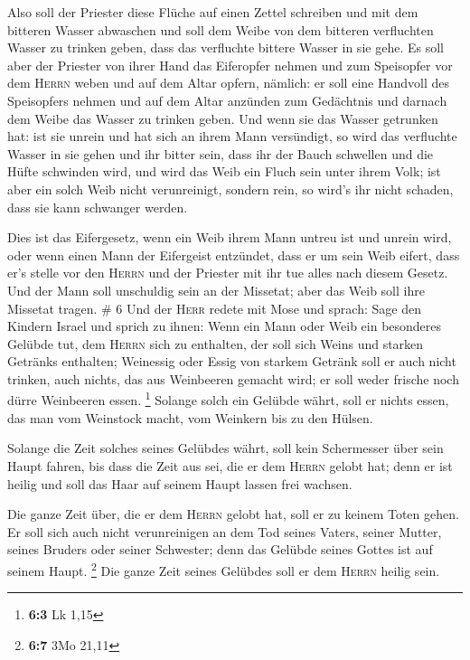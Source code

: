  Also soll der Priester diese Flüche auf einen Zettel
schreiben und mit dem bitteren Wasser abwaschen  und soll
dem Weibe von dem bitteren verfluchten Wasser zu trinken geben, dass das
verfluchte bittere Wasser in sie gehe.  Es soll aber der
Priester von ihrer Hand das Eiferopfer nehmen und zum Speisopfer vor dem
\textsc{Herrn} weben und auf dem Altar opfern, nämlich: 
er soll eine Handvoll des Speisopfers nehmen und auf dem Altar anzünden
zum Gedächtnis und darnach dem Weibe das Wasser zu trinken geben.
 Und wenn sie das Wasser getrunken hat: ist sie unrein
und hat sich an ihrem Mann versündigt, so wird das verfluchte Wasser in
sie gehen und ihr bitter sein, dass ihr der Bauch schwellen und die
Hüfte schwinden wird, und wird das Weib ein Fluch sein unter ihrem Volk;
 ist aber ein solch Weib nicht verunreinigt, sondern
rein, so wird's ihr nicht schaden, dass sie kann schwanger werden.

 Dies ist das Eifergesetz, wenn ein Weib ihrem Mann
untreu ist und unrein wird,  oder wenn einen Mann der
Eifergeist entzündet, dass er um sein Weib eifert, dass er's stelle vor
den \textsc{Herrn} und der Priester mit ihr tue alles nach diesem
Gesetz.  Und der Mann soll unschuldig sein an der
Missetat; aber das Weib soll ihre Missetat tragen. \# 6 
Und der \textsc{Herr} redete mit Mose und sprach:  Sage
den Kindern Israel und sprich zu ihnen: Wenn ein Mann oder Weib ein
besonderes Gelübde tut, dem \textsc{Herrn} sich zu enthalten,
 der soll sich Weins und starken Getränks enthalten;
Weinessig oder Essig von starkem Getränk soll er auch nicht trinken,
auch nichts, das aus Weinbeeren gemacht wird; er soll weder frische noch
dürre Weinbeeren essen. \footnote{\textbf{6:3} Lk 1,15} 
Solange solch ein Gelübde währt, soll er nichts essen, das man vom
Weinstock macht, vom Weinkern bis zu den Hülsen.

 Solange die Zeit solches seines Gelübdes währt, soll kein
Schermesser über sein Haupt fahren, bis dass die Zeit aus sei, die er
dem \textsc{Herrn} gelobt hat; denn er ist heilig und soll das Haar auf
seinem Haupt lassen frei wachsen.

 Die ganze Zeit über, die er dem \textsc{Herrn} gelobt
hat, soll er zu keinem Toten gehen.  Er soll sich auch
nicht verunreinigen an dem Tod seines Vaters, seiner Mutter, seines
Bruders oder seiner Schwester; denn das Gelübde seines Gottes ist auf
seinem Haupt. \footnote{\textbf{6:7} 3Mo 21,11}  Die ganze
Zeit seines Gelübdes soll er dem \textsc{Herrn} heilig sein.

